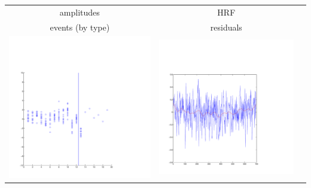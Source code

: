 \documentclass{beamer}
\begin{document}
\begin{frame}
\begin{tabular}{ccc}
amplitudes & HRF\\
events (by type) & residuals\\
\includegraphics[scale=0.15]{ex2_data1c.pdf} & \includegraphics[scale=0.15]{ex2_data1r.pdf}
\end{tabular}
\end{frame}
\end{document}

